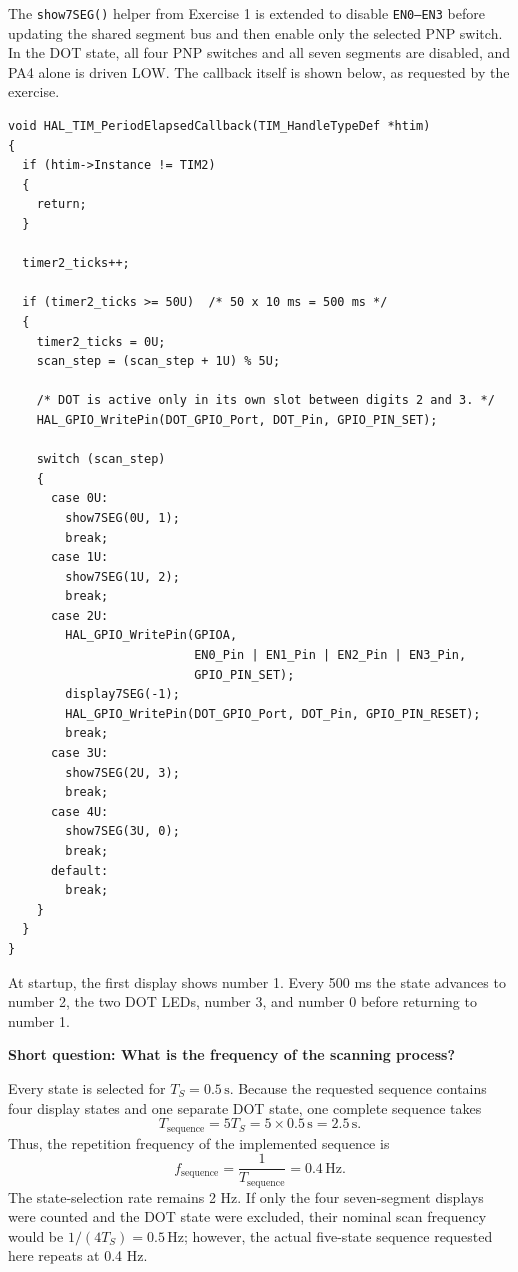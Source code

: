 The \texttt{show7SEG()} helper from Exercise 1 is extended to disable \texttt{EN0--EN3} before updating the shared segment bus and then enable only the selected PNP switch. In the DOT state, all four PNP switches and all seven segments are disabled, and PA4 alone is driven LOW. The callback itself is shown below, as requested by the exercise.

\begin{lstlisting}[caption={Timer callback for Exercise 2}]
void HAL_TIM_PeriodElapsedCallback(TIM_HandleTypeDef *htim)
{
  if (htim->Instance != TIM2)
  {
    return;
  }

  timer2_ticks++;

  if (timer2_ticks >= 50U)  /* 50 x 10 ms = 500 ms */
  {
    timer2_ticks = 0U;
    scan_step = (scan_step + 1U) % 5U;

    /* DOT is active only in its own slot between digits 2 and 3. */
    HAL_GPIO_WritePin(DOT_GPIO_Port, DOT_Pin, GPIO_PIN_SET);

    switch (scan_step)
    {
      case 0U:
        show7SEG(0U, 1);
        break;
      case 1U:
        show7SEG(1U, 2);
        break;
      case 2U:
        HAL_GPIO_WritePin(GPIOA,
                          EN0_Pin | EN1_Pin | EN2_Pin | EN3_Pin,
                          GPIO_PIN_SET);
        display7SEG(-1);
        HAL_GPIO_WritePin(DOT_GPIO_Port, DOT_Pin, GPIO_PIN_RESET);
        break;
      case 3U:
        show7SEG(2U, 3);
        break;
      case 4U:
        show7SEG(3U, 0);
        break;
      default:
        break;
    }
  }
}
\end{lstlisting}

At startup, the first display shows number 1. Every 500 ms the state advances to number 2, the two DOT LEDs, number 3, and number 0 before returning to number 1.

\textbf{Short question: What is the frequency of the scanning process?}

Every state is selected for $T_S=0.5\,\mathrm{s}$. Because the requested sequence contains four display states and one separate DOT state, one complete sequence takes
\[
T_{\mathrm{sequence}} = 5T_S = 5 \times 0.5\,\mathrm{s} = 2.5\,\mathrm{s}.
\]
Thus, the repetition frequency of the implemented sequence is
\[
\boxed{f_{\mathrm{sequence}} = \frac{1}{T_{\mathrm{sequence}}} = 0.4\,\mathrm{Hz}}.
\]
The state-selection rate remains 2 Hz. If only the four seven-segment displays were counted and the DOT state were excluded, their nominal scan frequency would be $1/(4T_S)=0.5\,\mathrm{Hz}$; however, the actual five-state sequence requested here repeats at 0.4 Hz.

